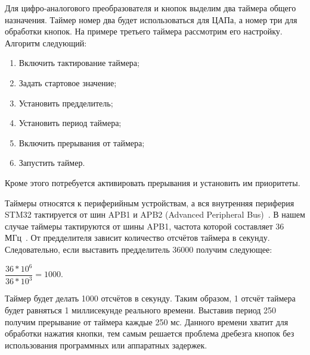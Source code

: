 	
	Для цифро-аналогового преобразователя и кнопок выделим два таймера общего назначения. Таймер номер два будет использоваться для ЦАПа, а номер три для обработки кнопок. На примере третьего таймера рассмотрим его настройку. Алгоритм следующий:
	
	\begin{enumerate}
		\item Включить тактирование таймера;
		\item Задать стартовое значение;
		\item Установить предделитель;
		\item Установить период таймера;
		\item Включить прерывания от таймера;
		\item Запустить таймер.
	\end{enumerate}	 
	
	Кроме этого потребуется активировать прерывания и установить им приоритеты.
	
	Таймеры относятся к периферийным устройствам, а вся внутренняя периферия STM32 тактируется от шин APB1 и APB2 (Advanced Peripheral Bus)~\cite{tim}. В нашем случае таймеры тактируются от шины APB1, частота которой составляет 36 МГц~\cite{f103}. От предделителя зависит количество отсчётов таймера в секунду. Следовательно, если выставить предделитель 36000 получим следующее:
	
	\begin{center}
	$\dfrac{36*10^{6}}{36*10^{3}}=1000.$
	\end{center}
	
	Таймер будет делать 1000 отсчётов в секунду. Таким образом, 1 отсчёт таймера будет равняться 1 миллисекунде реального времени. Выставив период 250 получим прерывание от таймера каждые 250 мс. Данного времени хватит для обработки нажатия кнопки, тем самым решается проблема дребезга кнопок без использования программных или аппаратных задержек.
	
